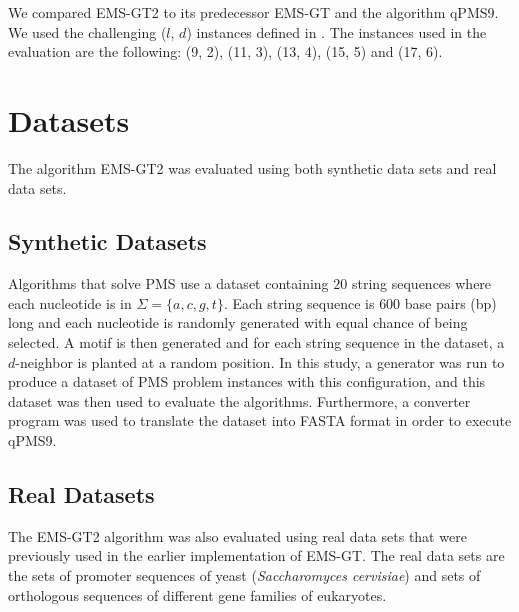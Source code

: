 We compared EMS-GT2 to its predecessor EMS-GT and the algorithm qPMS9. We used the challenging ($l$, $d$) instances defined in \cite{pms2015}. The instances used in the evaluation are the following: (9, 2), (11, 3), (13, 4), (15, 5) and (17, 6).

\section{Datasets}

The algorithm EMS-GT2 was evaluated using both synthetic data sets and real data sets.

\subsection{Synthetic Datasets}
Algorithms that solve PMS \cite{pevzner2000combinatorial, pms2014, pms2015} use a dataset containing $20$ string sequences where each nucleotide is in $\Sigma = \{a, c, g, t\}$. Each string sequence is $600$ base pairs (bp) long and each nucleotide is randomly generated with equal chance of being selected. A motif is then generated and for each string sequence in the dataset, a $d$-neighbor is planted at a random position. In this study, a generator was run to produce a dataset of PMS problem instances with this configuration, and this dataset was then used to evaluate the algorithms. Furthermore, a converter program was used to translate the dataset into FASTA format in order to execute qPMS9.


\subsection{Real Datasets}

The EMS-GT2 algorithm was also evaluated using real data sets that were previously used in the earlier implementation of EMS-GT. The real data sets are the sets of promoter sequences of yeast (\textit{Saccharomyces cervisiae}) \cite{zhu1999scpd} and sets of orthologous sequences of different gene families of eukaryotes.



